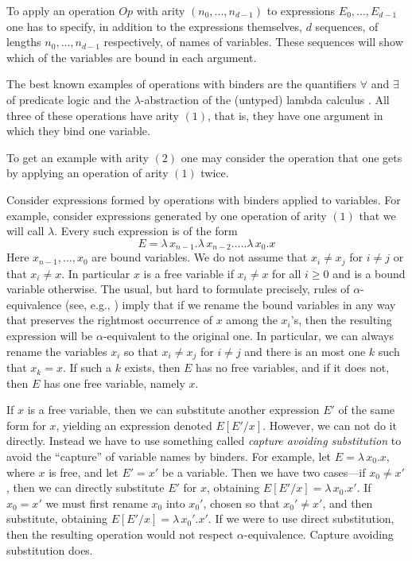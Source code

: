 \documentclass[12pt]{amsart}
\numberwithin{proposition}{subsection}
\begin{document}
To apply an operation $Op$ with arity $(n_0,\dots,n_{d-1})$ to expressions
$E_0,\dots,E_{d-1}$ one has to specify, in addition to the expressions
themselves, $d$ sequences, of lengths $n_0,\dots,n_{d-1}$ respectively, of
names of variables. These sequences will show which of the variables are bound
in each argument.

The best known examples of operations with binders are the quantifiers
$\forall$ and $\exists$ of predicate logic and the $\lambda$-abstraction of the
(untyped) lambda calculus \cite{Church1932,Barendregt}. All three of
these operations have arity $(1)$, that is, they have one argument in which
they bind one variable.

To get an example with arity $(2)$ one may consider the operation that one gets by applying an operation of arity $(1)$ twice.

Consider expressions formed by operations with binders applied to
variables. For example, consider expressions generated by one operation of
arity $(1)$ that we will call $\lambda$. Every such expression is of the form
%
$$E=\lambda\,x_{n-1}.\lambda\,x_{n-2}.\dots.\lambda\,x_0.x$$
%
Here $x_{n-1},\dots,x_{0}$ are bound variables.  We do not assume that $x_i\ne x_j$
for $i\ne j$ or that $x_i\ne x$. In particular $x$ is a free variable if
$x_i\ne x$ for all $i\ge 0$ and is a bound variable otherwise. The usual, but hard to
formulate precisely, rules of $\alpha$-equivalence (see, e.g., \cite[Def. 2.1.11,
  p.~26]{Barendregt}) imply that if we rename the bound variables in any way
that preserves the rightmost occurrence of $x$ among the $x_i$'s, then the
resulting expression will be $\alpha$-equivalent to the original one. In
particular, we can always rename the variables $x_i$ so that $x_i\ne x_j$ for $i\ne j$ and
there is an most one $k$ such that $x_k=x$. If such a $k$ exists, then $E$ has
no free variables, and if it does not, then $E$ has one free variable, namely $x$.

If $x$ is a free variable, then we can substitute another expression $E'$ of the
same form for $x$, yielding an expression denoted $E[E'/x]$.  However, we can not do it directly. Instead we have to use
something called {\em capture avoiding substitution} to avoid the
``capture'' of variable names by binders. For example, let $E=\lambda\,x_0.x$,
where $x$ is free, and let $E'=x'$ be a variable.  Then we have two cases---if $x_0\ne x'$, then we
can directly substitute $E'$ for $x$, obtaining $E[E'/x]=\lambda\,x_0.x'$. If $x_0=x'$
we must first rename $x_0$ into $x_0'$, chosen so that $x_0'\ne x'$, and then
substitute, obtaining $E[E'/x]=\lambda\,x_0'.x'$. If we were to use direct
substitution, then the resulting operation would not respect 
$\alpha$-equivalence.  Capture avoiding substitution does.
\end{document}
